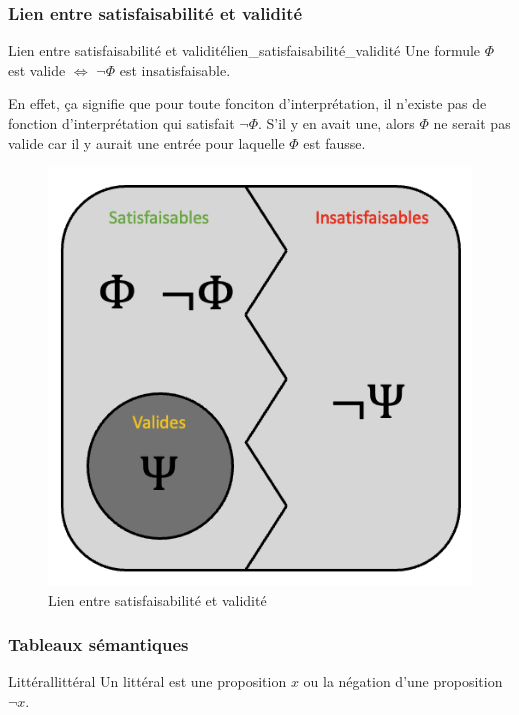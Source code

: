 \subsubsection{Lien entre satisfaisabilité et validité}
\begin{theorem}{Lien entre satisfaisabilité et validité}{lien_satisfaisabilité_validité}
  Une formule $\Phi$ est valide $\Leftrightarrow$ $\neg\Phi$ est insatisfaisable.
\end{theorem}
En effet, ça signifie que pour toute fonciton d'interprétation, il n'existe pas de fonction d'interprétation qui satisfait $\neg\Phi$.
S'il y en avait une, alors $\Phi$ ne serait pas valide car il y aurait une entrée pour laquelle $\Phi$ est fausse.
\begin{figure}[H]
  \centering
  \includegraphics[scale=0.3]{pictures/satisf:vali.png}
  \caption{Lien entre satisfaisabilité et validité}
\end{figure}


\subsubsection{Tableaux sémantiques}
\begin{definition}{Littéral}{littéral}
  Un littéral est une proposition $x$ ou la négation d'une proposition $\neg x$.
\end{definition}

